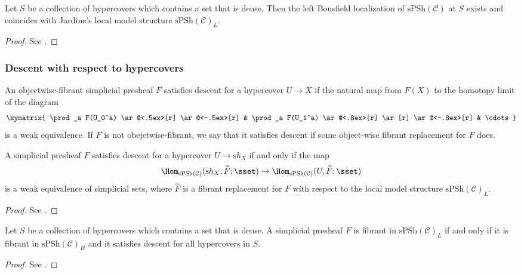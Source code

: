 \begin{thm}
Let $S$ be a collection of hypercovers which contains a set that is dense. Then the left Bousfield localization of $\mathrm{sPSh}(\mathcal C)$ at $S$ exists and coincides with Jardine's local model structure $\mathrm{sPSh}(\mathcal C)_L$.
\end{thm}

\begin{proof}
See .
\end{proof}

\subsubsection{Descent with respect to hypercovers}

\begin{defin}
An objectwise-fibrant simplicial presheaf $F$ satisfies descent for a hypercover $U \to X$ if the natural map from $F(X)$ to the homotopy limit of the diagram
\[
\xymatrix{
\prod_a F(U_0^a) \ar@<.5ex>[r] \ar@<-.5ex>[r] & \prod_a F(U_1^a) \ar@<.8ex>[r] \ar[r] \ar@<-.8ex>[r] & \cdots
}
\]
is a weak equivalence. If $F$ is not obejctwise-fibrant, we say that it satisfies descent if some object-wise fibrant replacement for $F$ does.
\end{defin}

\begin{lemma}
A simplicial presheaf $F$ satisfies descent for a hypercover $U \to \mathrm sh_X$ if and only if the map
\[
\Hom_{\mathrm{sPSh}(\mathcal C)}(\mathrm sh_X, \widehat{F};\sset) \to \Hom_{\mathrm{sPSh}(\mathcal C)}(U, \widehat{F};\sset)
\]
is a weak equivalence of simplicial sets, where $\widehat{F}$ is a fibrant replacement for $F$ with respect to the local model structure $\mathrm{sPSh}(\mathcal C)_L$.
\end{lemma}

\begin{proof}
See .
\end{proof}

\begin{thm}
Let $S$ be a collection of hypercovers which contains a set that is dense. A simplicial presheaf $F$ is fibrant in $\mathrm{sPSh}(\mathcal C)_L$ if and only if it is fibrant in $\mathrm{sPSh}(\mathcal C)_H$ and it satisfies descent for all hypercovers in $S$.
\end{thm}

\begin{proof}
See .
\end{proof}

